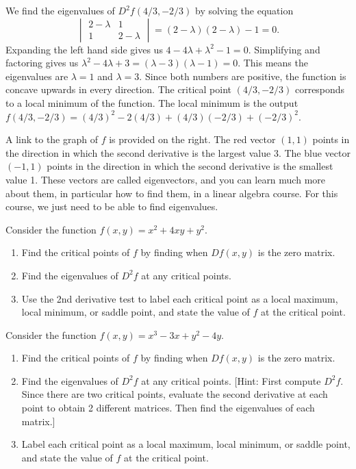 \begin{example}
{}
We find the eigenvalues of $D^2 f(4/3,-2/3)$ by solving the equation 
$$\begin{vmatrix}2-\lambda&1 \\1&2-\lambda\end{vmatrix} = (2-\lambda)(2-\lambda)-1=0.$$ 
 Expanding the left hand side gives us {$4-4\lambda + \lambda^2 -1 = 0$}. Simplifying and factoring gives us $\lambda^2-4\lambda +3 = (\lambda-3)(\lambda -1) = 0$. This means the eigenvalues are $\lambda = 1$ and $\lambda=3$. Since both numbers are positive, the function is concave upwards in every direction.  The critical point $(4/3,-2/3)$ corresponds to a local minimum of the function. The local minimum is the output $f(4/3,-2/3) = (4/3)^2-2(4/3)+(4/3)(-2/3)+(-2/3)^2$.

A link to the graph of $f$ is provided on the right. 
The red vector $(1,1)$ points in the direction in which the second derivative is the largest value 3. 
The blue vector $(-1,1)$ points in the direction in which the second derivative is the smallest value 1.
These vectors are called eigenvectors, and you can learn much more about them, in particular how to find them, in a linear algebra course. For this course, we just need to be able to find eigenvalues.
\end{example}
 
\newpage

\begin{problem}
%
Consider the function $f(x,y)=x^2+4xy+y^2$.  
\begin{enumerate}
 \item Find the critical points of $f$ by finding when $Df(x,y)$ is the zero matrix.
 \item Find the eigenvalues of $D^2f$ at any critical points.
 \item Use the 2nd derivative test to label each critical point as a local maximum, local minimum, or saddle point, and state the value of $f$ at the critical point.
\end{enumerate}
\end{problem}


\begin{problem}
Consider the function $f(x,y)=x^3-3x+y^2-4y$.  
\begin{enumerate}
 \item Find the critical points of $f$ by finding when $Df(x,y)$ is the zero matrix.
 \item Find the eigenvalues of $D^2f$ at any critical points. [Hint: First compute $D^2f$. Since there are two critical points, evaluate the second derivative at each point to obtain 2 different matrices. Then find the eigenvalues of each matrix.]
 \item Label each critical point as a local maximum, local minimum, or saddle point, and state the value of $f$ at the critical point.
\end{enumerate}
\end{problem}

